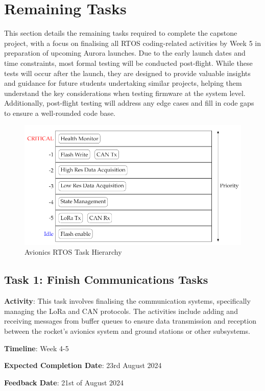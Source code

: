 \section{Remaining Tasks}
This section details the remaining tasks required to complete the capstone project, with a focus on finalising all RTOS coding-related activities by Week 5 in preparation of upcoming Aurora launches. Due to the early launch dates and time constraints, most formal testing will be conducted post-flight. While these tests will occur after the launch, they are designed to provide valuable insights and guidance for future students undertaking similar projects, helping them understand the key considerations when testing firmware at the system level. Additionally, post-flight testing will address any edge cases and fill in code gaps to ensure a well-rounded code base.
\begin{figure}
    \centering
    \includegraphics[width=1\linewidth]{img/RTOS-task-hierarchy.png}
    \caption{Avionics RTOS Task Hierarchy}
    \label{fig:enter-label}
\end{figure}

\subsection{Task 1: Finish Communications Tasks}
\textbf{Activity}: This task involves finalising the communication systems, specifically managing the LoRa and CAN protocols. The activities include adding and receiving messages from buffer queues to ensure data transmission and reception between the rocket's avionics system and ground stations or other subsystems. 

\textbf{Timeline}: Week 4-5

\textbf{Expected Completion Date}: 23rd August 2024

\textbf{Feedback Date}: 21st of August 2024

